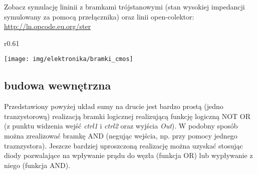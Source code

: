\documentclass{pdfBooklets}
\begin{document}
Zobacz symulację lininii z bramkami trójstanowymi (stan wysokiej impedancji symulowany za pomocą przełącznika) oraz linii open-colektor: \url{http://ln.opcode.eu.org/ster}

\begin{wrapfigure}{r}{0.61\textwidth}
  \begin{center}
    \vspace{-45pt}
    \texttt{[image: img/elektronika/bramki\_cmos]}
    \vspace{-35pt}
  \end{center}
\end{wrapfigure}
\subsection{budowa wewnętrzna}
Przedstawiony powyżej układ sumy na drucie jest bardzo prostą (jedno tranzystorową) realizacją bramki logicznej realizującą funkcję logiczną NOT OR (z punktu widzenia wejść \textit{ctrl1} i \textit{ctrl2} oraz wyjścia \textit{Out}).
W podobny sposób można zrealizować bramkę AND (negując wejścia, np. przy pomocy jednego traznzystora).
Jeszcze bardziej uproszczoną realizację można uzyskać stosując diody pozwalające na wpływanie prądu do węzła (funkcja OR) lub wypływanie z niego (funkcja AND).
\end{document}
